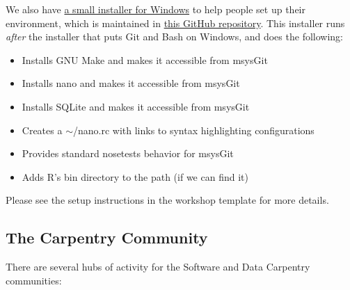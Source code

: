 We also have \href{https://github.com/swcarpentry/windows-installer/releases/download/v0.3/SWCarpentryInstaller.exe}{a small installer for Windows}
to help people set up their environment,
which is maintained in \href{https://github.com/swcarpentry/windows-installer}{this GitHub repository}.
This installer runs \emph{after} the installer that puts Git and Bash on Windows,
and does the following:

\begin{itemize}
\item Installs GNU Make and makes it accessible from msysGit
\item Installs nano and makes it accessible from msysGit
\item Installs SQLite and makes it accessible from msysGit
\item Creates a \ensuremath{\sim}/nano.rc with links to syntax highlighting configurations
\item Provides standard nosetests behavior for msysGit
\item Adds R's bin directory to the path (if we can find it)
\end{itemize}

Please see the setup instructions in the workshop template for more details.

\subsection*{The Carpentry Community}

There are several hubs of activity for the Software and Data Carpentry communities:

